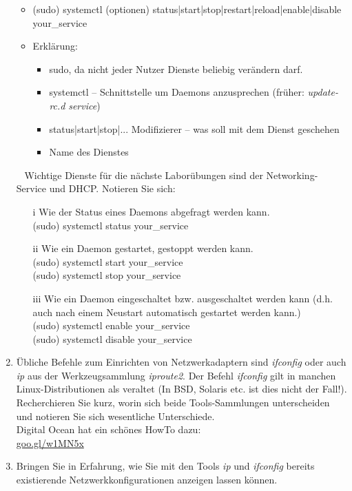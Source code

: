 \documentclass[paper=a4,fontsize=11pt]{scrartcl}%
\numberwithin{equation}{section}
\begin{document}
\begin{enumerate}
\begin{tasks}
		\begin{itemize}
			\item (sudo) systemctl (optionen) status|start|stop|restart|reload|enable|disable your\_service
			\item Erklärung:
			\begin{itemize}
				\item sudo, da nicht jeder Nutzer Dienste beliebig verändern darf.
				\item systemctl -- Schnittstelle um Daemons anzusprechen (früher: \emph{update-rc.d} \emph{service})
				\item status|start|stop|... Modifizierer -- was soll mit dem Dienst geschehen
				\item Name des Dienstes 
\end{itemize}			 
		\end{itemize}
		\task~ Wichtige Dienste für die nächste Laborübungen sind der Networking-Service und DHCP. Notieren Sie sich:
		\begin{itemize}
			\item[i] Wie der Status eines Daemons abgefragt werden kann.\\
			(sudo) systemctl status your\_service
			\item[ii] Wie ein Daemon gestartet, gestoppt werden kann.\\
			(sudo) systemctl start your\_service\\
			(sudo) systemctl stop your\_service
			\item[iii] Wie ein Daemon eingeschaltet bzw. ausgeschaltet werden kann (d.h. auch nach einem Neustart automatisch gestartet werden kann.)\\
			(sudo) systemctl enable your\_service\\
			(sudo) systemctl disable your\_service
		\end{itemize}
	\end{tasks}  
	\item Übliche Befehle zum Einrichten von Netzwerkadaptern sind \emph{ifconfig} oder auch \emph{ip} aus der Werkzeugsammlung \emph{iproute2}. Der Befehl \emph{ifconfig} gilt in manchen Linux-Distributionen als veraltet (In BSD, Solaris etc. ist dies nicht der Fall!). Recherchieren Sie kurz, worin sich beide Tools-Sammlungen unterscheiden und notieren Sie sich wesentliche Unterschiede.\\
	Digital Ocean hat ein schönes HowTo dazu:\\
 \url{goo.gl/w1MN5x}
 	\item Bringen Sie in Erfahrung, wie Sie mit den Tools \emph{ip} und \emph{ifconfig} bereits existierende Netzwerkkonfigurationen anzeigen lassen können.

\end{enumerate}
\end{document}
